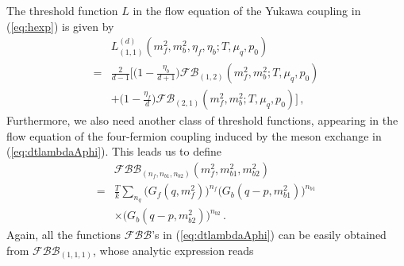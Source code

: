 \documentclass[%
reprint,
superscriptaddress,
showpacs,preprintnumbers,
 amsmath,amssymb,
 aps,
prd,
]{revtex4-1}
\def\eq#1{(\ref{#1})}
\begin{document}
%
The threshold function $L$ in the flow equation of the Yukawa coupling
in \eq{eq:hexp} is given by
%
\begin{align}
  &L_{(1,1)}^{(d)}(m_f^2,m_b^2,\eta_{f},\eta_{b};
    T,\mu_q,p_0)\nonumber\\[1ex]
  =&\frac{2}{d-1}\bigg[\Big(1-\frac{\eta_{b}}{
     d+1}\Big)\mathcal{FB}_{(1,2)}(
     m_f^2,m_b^2;T,\mu_q,p_0)\nonumber\\[1ex]
  &+\Big(1-\frac{\eta_{f}}{d}\Big)\mathcal{FB}_{(2,1)}(
    m_f^2,m_b^2;T,\mu_q,p_0)\bigg]\,,
\end{align}
%
Furthermore, we also need another class of threshold functions,
appearing in the flow equation of the four-fermion coupling induced by
the meson exchange in \eq{eq:dtlambdaAphi}. This leads us to define
%
\begin{align}
  &\mathcal{FBB}_{(n_f,n_{b1},n_{b2})}(m_f^2,m_{b1}^2,m_{b2}^2)\nonumber
  \\[1ex]\nonumber 
  =&\frac{T}{k}\sum_{n_q}\Big(G_{f}(q,m_f^2)\Big)^{n_f}\Big(G_{b}(
     q-p,m_{b1}^2)\Big)^{n_{b1}}\nonumber\\[1ex]
  &\times
    \Big(G_{b}(q-p,m_{b2}^2)\Big)^{n_{b2}}\,.
\end{align}
%
Again, all the functions $\mathcal{FBB}$'s in
\eq{eq:dtlambdaAphi} can be easily obtained from
$\mathcal{FBB}_{(1,1,1)}$, whose analytic expression reads
%
\end{document}
